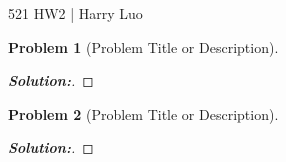\documentclass[12pt]{article}
\theoremstyle{definition}\newtheorem{problem}{Problem}
\newenvironment{solution}{\begin{proof}[\bfseries\textup{Solution:}]}{\end{proof}}
\begin{document}

\begin{center}
521 HW2 | Harry Luo 
\end{center}

\begin{problem}[Problem Title or Description]

\end{problem}
\begin{solution}
%



\end{solution}

\newpage
\begin{problem}[Problem Title or Description]
\end{problem}
\begin{solution}
\end{solution}

\end{document}
